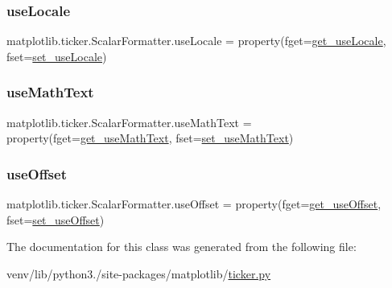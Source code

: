 \subsubsection{\texorpdfstring{use\+Locale}{useLocale}}
{\footnotesize\ttfamily matplotlib.\+ticker.\+Scalar\+Formatter.\+use\+Locale = property(fget=\hyperlink{classmatplotlib_1_1ticker_1_1ScalarFormatter_a3d474a0a355cbf753eb9340ae80e4839}{get\+\_\+use\+Locale}, fset=\hyperlink{classmatplotlib_1_1ticker_1_1ScalarFormatter_a03dd9ef155683dca654facedea82de00}{set\+\_\+use\+Locale})\hspace{0.3cm}{\ttfamily [static]}}

\mbox{\label{classmatplotlib_1_1ticker_1_1ScalarFormatter_a59e6bbff5de710c66bd601df93f15d6d}} 
\subsubsection{\texorpdfstring{use\+Math\+Text}{useMathText}}
{\footnotesize\ttfamily matplotlib.\+ticker.\+Scalar\+Formatter.\+use\+Math\+Text = property(fget=\hyperlink{classmatplotlib_1_1ticker_1_1ScalarFormatter_a1687f734f10eac1abd32d52ef58feadd}{get\+\_\+use\+Math\+Text}, fset=\hyperlink{classmatplotlib_1_1ticker_1_1ScalarFormatter_ac3a831d21e643c139e1bbaebb1027eb7}{set\+\_\+use\+Math\+Text})\hspace{0.3cm}{\ttfamily [static]}}

\mbox{\label{classmatplotlib_1_1ticker_1_1ScalarFormatter_a8bb3fb64e3c3fcbd16cf7d224f8345b2}} 
\subsubsection{\texorpdfstring{use\+Offset}{useOffset}}
{\footnotesize\ttfamily matplotlib.\+ticker.\+Scalar\+Formatter.\+use\+Offset = property(fget=\hyperlink{classmatplotlib_1_1ticker_1_1ScalarFormatter_ad888084ada89fd2462e54346988ee0bb}{get\+\_\+use\+Offset}, fset=\hyperlink{classmatplotlib_1_1ticker_1_1ScalarFormatter_aec6995dab1fd846023a6c48f88e88f9c}{set\+\_\+use\+Offset})\hspace{0.3cm}{\ttfamily [static]}}



The documentation for this class was generated from the following file\+:\begin{DoxyCompactItemize}
\item 
venv/lib/python3./site-\/packages/matplotlib/\hyperlink{ticker_8py}{ticker.\+py}\end{DoxyCompactItemize}
